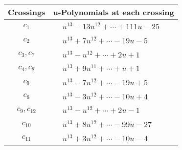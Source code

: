 \documentclass[1p]{elsarticle_modified}
\theoremstyle{definition}
\begin{document}
\begin{tabular}{m{50pt}|m{274pt}}
Crossings & \hspace{64pt}u-Polynomials at each crossing \\
\hline $$\begin{aligned}c_{1}\end{aligned}$$&$\begin{aligned}
&u^{13}-13 u^{12}+\cdots+111 u-25
\end{aligned}$\\
\hline $$\begin{aligned}c_{2}\end{aligned}$$&$\begin{aligned}
&u^{13}+7 u^{12}+\cdots-19 u-5
\end{aligned}$\\
\hline $$\begin{aligned}c_{3},c_{7}\end{aligned}$$&$\begin{aligned}
&u^{13}- u^{12}+\cdots+2 u+1
\end{aligned}$\\
\hline $$\begin{aligned}c_{4},c_{8}\end{aligned}$$&$\begin{aligned}
&u^{13}+9 u^{11}+\cdots+u+1
\end{aligned}$\\
\hline $$\begin{aligned}c_{5}\end{aligned}$$&$\begin{aligned}
&u^{13}-7 u^{12}+\cdots-19 u+5
\end{aligned}$\\
\hline $$\begin{aligned}c_{6}\end{aligned}$$&$\begin{aligned}
&u^{13}-3 u^{12}+\cdots-10 u+4
\end{aligned}$\\
\hline $$\begin{aligned}c_{9},c_{12}\end{aligned}$$&$\begin{aligned}
&u^{13}- u^{12}+\cdots+2 u-1
\end{aligned}$\\
\hline $$\begin{aligned}c_{10}\end{aligned}$$&$\begin{aligned}
&u^{13}+8 u^{12}+\cdots-99 u-27
\end{aligned}$\\
\hline $$\begin{aligned}c_{11}\end{aligned}$$&$\begin{aligned}
&u^{13}+3 u^{12}+\cdots-10 u-4
\end{aligned}$\\
\hline
\end{tabular}\\~\\
\end{document}
